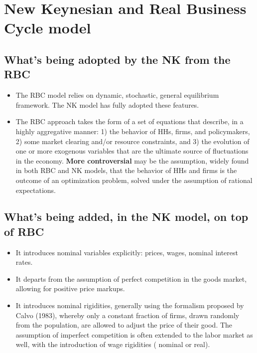 \documentclass[10pt]{article}
\title{}
\author{}
\date{}
\begin{document}
\maketitle


\section{New Keynesian and Real Business Cycle model}

\subsection{What's being adopted by the NK from the RBC}
\begin{itemize}
\item 
The RBC model relies on dynamic, stochastic, general equilibrium framework.
The NK model has fully adopted these features.
\item 
The RBC approach takes the form of a set of equations that describe, in  a
highly aggregative manner: 1) the behavior of HHs, firms, and policymakers,
2) some market clearing and/or resource constraints, and 3) the evolution of
one or more exogenous variables that are the ultimate source of fluctuations 
in the economy.
{\textbf {More controversial}} may be the assumption, widely found in both 
RBC and NK models, that the behavior of HHs and firms is the outcome of an
optimization problem, solved under the assumption of rational expectations.
\end{itemize}


\subsection{What's being added, in the NK model, on top of RBC}
\begin{itemize}
\item 
		It introduces nominal variables explicitly: prices, wages, nominal 
		interest rates.
\item 
		It departs from the assumption of perfect competition in the goods
		market, allowing for positive price markups.
\item 
		It introduces nominal rigidities, generally using the formalism
		proposed by Calvo (1983), whereby only a constant fraction of 
		firms, drawn randomly from the population, are allowed to adjust
		the price of their good.
    The assumption of imperfect competition is often extended to the 
		labor market as well, with the introduction of wage rigidities (
		nominal or real).
\end{itemize}
\end{document}
